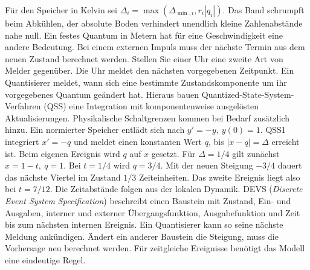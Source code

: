 \hypertarget{punkt6-1-3}{}
Für den Speicher in Kelvin sei \(\Delta_i=\max(\Delta_{\min,i},r_i|q_i|)\). Das Band schrumpft beim Abkühlen, der absolute Boden verhindert unendlich kleine Zahlenabstände nahe null. Ein festes Quantum in Metern hat für eine Geschwindigkeit eine andere Bedeutung. Bei einem externen Impuls muss der nächste Termin aus dem neuen Zustand berechnet werden.
Stellen Sie einer Uhr eine zweite Art von Melder gegenüber. Die Uhr meldet den nächsten vorgegebenen Zeitpunkt. Ein Quantisierer meldet, wann sich eine bestimmte Zustandskomponente um ihr vorgegebenes Quantum geändert hat. Hieraus bauen Quantized-State-System-Verfahren (QSS) eine Integration mit komponentenweise ausgelösten Aktualisierungen. Physikalische Schaltgrenzen kommen bei Bedarf zusätzlich hinzu.
Ein normierter Speicher entlädt sich nach \(y'=-y,\ y(0)=1\). QSS1 integriert \(x'=-q\) und meldet einen konstanten Wert \(q\), bis \(|x-q|=\Delta\) erreicht ist. Beim eigenen Ereignis wird \(q\) auf \(x\) gesetzt. Für \(\Delta=1/4\) gilt zunächst \(x=1-t,\ q=1\). Bei \(t=1/4\) wird \(q=3/4\). Mit der neuen Steigung \(-3/4\) dauert das nächste Viertel im Zustand \(1/3\) Zeiteinheiten. Das zweite Ereignis liegt also bei \(t=7/12\). Die Zeitabstände folgen aus der lokalen Dynamik.
DEVS (\emph{Discrete Event System Specification}) beschreibt einen Baustein mit Zustand, Ein- und Ausgaben, interner und externer Übergangsfunktion, Ausgabefunktion und Zeit bis zum nächsten internen Ereignis. Ein Quantisierer kann so seine nächste Meldung ankündigen. Ändert ein anderer Baustein die Steigung, muss die Vorhersage neu berechnet werden. Für zeitgleiche Ereignisse benötigt das Modell eine eindeutige Regel.

